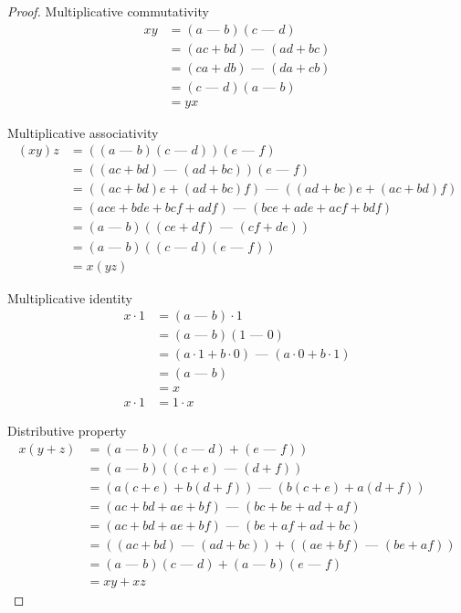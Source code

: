 \documentclass[answers,12pt]{exam}
\newcommand{\fakeminus}{\text{ --- }}
\begin{document}
\begin{solution}
\begin{proof}
    Multiplicative commutativity
    \begin{align*}
        xy &= (a \fakeminus b)(c \fakeminus d) \\
        &= (ac + bd) \fakeminus (ad + bc) \\
        &= (ca + db) \fakeminus (da + cb) \\ 
        &= (c \fakeminus d)(a \fakeminus b) \\
        &= yx
    \end{align*}

    Multiplicative associativity
    \begin{align*}
        (xy)z &= ((a \fakeminus b)(c \fakeminus d))(e \fakeminus f) \\
        &= ((ac + bd) \fakeminus (ad + bc))(e \fakeminus f) \\
        &= ((ac + bd)e + (ad + bc)f) \fakeminus ((ad + bc)e + (ac + bd)f) \\ 
        &= (ace + bde + bcf + adf) \fakeminus (bce + ade + acf + bdf) \\
        &= (a \fakeminus b)((ce + df) \fakeminus (cf + de)) \\
        &= (a \fakeminus b)((c \fakeminus d)(e \fakeminus f)) \\
        &= x(yz)
    \end{align*}

    Multiplicative identity
    \begin{align*}
        x \cdot 1 &= (a \fakeminus b) \cdot 1 \\
        &= (a \fakeminus b)(1 \fakeminus 0) \\
        &= (a \cdot 1 + b \cdot 0) \fakeminus (a \cdot 0 + b \cdot 1) \\
        &= (a \fakeminus b) \\
        &= x \\
        x \cdot 1 &= 1 \cdot x
    \end{align*}
    
    Distributive property
    \begin{align*}
        x(y+z) &= (a \fakeminus b)((c \fakeminus d) + (e \fakeminus f)) \\
        &= (a \fakeminus b) ((c+e) \fakeminus (d+f)) \\\
        &= (a(c+e) + b(d+f)) \fakeminus (b(c+e) + a(d+f)) \\
        &= (ac + bd + ae + bf) \fakeminus (bc + be + ad + af) \\
        &= (ac + bd + ae + bf) \fakeminus (be + af + ad + bc) \\
        &= ((ac +bd) \fakeminus (ad + bc)) + ((ae + bf) \fakeminus (be + af)) \\
        &= (a \fakeminus b)(c \fakeminus d) + (a \fakeminus b)(e \fakeminus f) \\
        &= xy + xz
    \end{align*}
\end{proof}
\end{solution}
\end{document}

